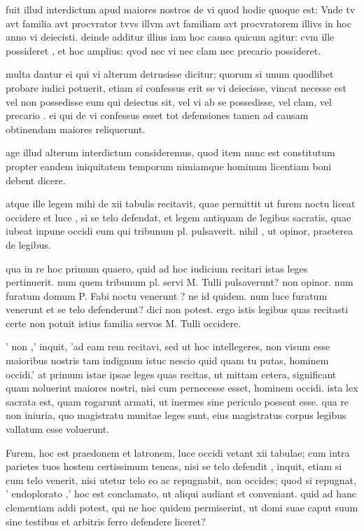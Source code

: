  fuit illud interdictum apud maiores nostros de vi quod hodie quoque est: Vnde tv avt familia avt procvrator tvvs illvm avt familiam avt procvratorem illivs in hoc anno vi deiecisti. deinde additur illius iam hoc causa quicum agitur: cvm ille possideret , et hoc amplius: qvod nec vi nec clam nec precario possideret.

 multa dantur ei qui vi alterum detrusisse dicitur; quorum si unum quodlibet probare iudici potuerit, etiam si confessus erit se vi deiecisse, vincat necesse est vel non possedisse eum qui deiectus sit, vel vi ab se possedisse, vel clam, vel precario . ei qui de vi confessus esset tot defensiones tamen ad causam obtinendam maiores reliquerunt.

 age illud alterum interdictum consideremus, quod item nunc est constitutum propter eandem iniquitatem temporum nimiamque hominum licentiam boni debent dicere.

 atque ille legem mihi de xii tabulis recitavit, quae permittit ut furem noctu liceat occidere et luce , si se telo defendat, et legem antiquam de legibus sacratis, quae iubeat inpune occidi eum qui tribunum pl. pulsaverit. nihil , ut opinor, praeterea de legibus.

 qua in re hoc primum quaero, quid ad hoc iudicium recitari istas leges pertinuerit. num quem tribunum pl. servi M. Tulli pulsaverunt? non opinor. num furatum domum P. Fabi noctu venerunt ? ne id quidem. num luce furatum venerunt et se telo defenderunt? dici non potest. ergo istis legibus quas recitasti certe non potuit istius familia servos M. Tulli occidere.

 ' non ,' inquit, 'ad eam rem recitavi, sed ut hoc intellegeres, non visum esse maioribus nostris tam indignum istuc nescio quid quam tu putas, hominem occidi.' at primum istae ipsae leges quas recitas, ut mittam cetera, significant quam noluerint maiores nostri, nisi cum pernecesse esset, hominem occidi. ista lex sacrata est, quam rogarunt armati, ut inermes sine periculo possent esse. qua re non iniuria, quo magistratu munitae leges sunt, eius magistratus corpus legibus vallatum esse voluerunt.

 Furem, hoc est praedonem et latronem, luce occidi vetant xii tabulae; cum intra parietes tuos hostem certissimum teneas, nisi se telo defendit , inquit, etiam si cum telo venerit, nisi utetur telo eo ac repugnabit, non occides; quod si repugnat, ' endoplorato ,' hoc est conclamato, ut aliqui audiant et conveniant. quid ad hanc clementiam addi potest, qui ne hoc quidem permiserint, ut domi suae caput suum sine testibus et arbitris ferro defendere liceret?

